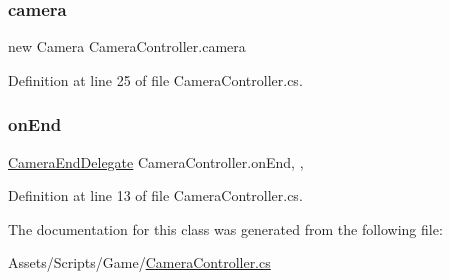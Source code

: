 \subsubsection{\texorpdfstring{camera}{camera}}
{\footnotesize\ttfamily new Camera Camera\+Controller.\+camera\hspace{0.3cm}{\ttfamily [get]}}



Definition at line 25 of file Camera\+Controller.\+cs.

\mbox{\label{class_camera_controller_a9d88e2bce9ea6e7279f6524722069ae3}} 
\subsubsection{\texorpdfstring{on\+End}{onEnd}}
{\footnotesize\ttfamily \mbox{\hyperlink{_camera_controller_8cs_a2329f0155caaad919c97c5f57e062b81}{Camera\+End\+Delegate}} Camera\+Controller.\+on\+End\hspace{0.3cm}{\ttfamily [static]}, {\ttfamily [get]}, {\ttfamily [set]}}



Definition at line 13 of file Camera\+Controller.\+cs.



The documentation for this class was generated from the following file\+:\begin{DoxyCompactItemize}
\item 
Assets/\+Scripts/\+Game/\mbox{\hyperlink{_camera_controller_8cs}{Camera\+Controller.\+cs}}\end{DoxyCompactItemize}
